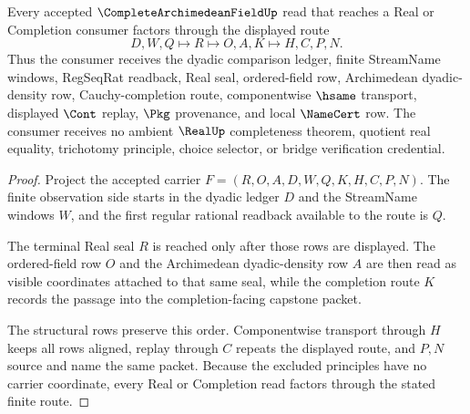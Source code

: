 \begin{theorem}
\label{thm:complete-archimedean-field-real-route}
Every accepted $\CompleteArchimedeanFieldUp$ read that reaches a Real or Completion consumer factors through the displayed route
$$
D,W,Q \longmapsto R \longmapsto O,A,K \longmapsto H,C,P,N .
$$
Thus the consumer receives the dyadic comparison ledger, finite StreamName windows, RegSeqRat readback, Real seal, ordered-field row, Archimedean dyadic-density row, Cauchy-completion route, componentwise $\hsame$ transport, displayed $\Cont$ replay, $\Pkg$ provenance, and local $\NameCert$ row. The consumer receives no ambient $\RealUp$ completeness theorem, quotient real equality, trichotomy principle, choice selector, or bridge verification credential.
\end{theorem}
\begin{proof}
Project the accepted carrier $F=(R,O,A,D,W,Q,K,H,C,P,N)$. The finite observation side starts in the dyadic ledger $D$ and the StreamName windows $W$, and the first regular rational readback available to the route is $Q$.

The terminal Real seal $R$ is reached only after those rows are displayed. The ordered-field row $O$ and the Archimedean dyadic-density row $A$ are then read as visible coordinates attached to that same seal, while the completion route $K$ records the passage into the completion-facing capstone packet.

The structural rows preserve this order. Componentwise transport through $H$ keeps all rows aligned, replay through $C$ repeats the displayed route, and $P,N$ source and name the same packet. Because the excluded principles have no carrier coordinate, every Real or Completion read factors through the stated finite route.
\end{proof}



